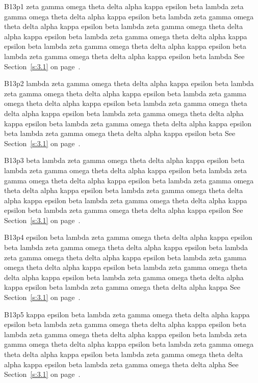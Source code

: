 B13p1 zeta gamma omega theta delta alpha kappa epsilon beta lambda zeta gamma omega theta delta alpha kappa epsilon beta lambda zeta gamma omega theta delta alpha kappa epsilon beta lambda zeta gamma omega theta delta alpha kappa epsilon beta lambda zeta gamma omega theta delta alpha kappa epsilon beta lambda zeta gamma omega theta delta alpha kappa epsilon beta lambda zeta gamma omega theta delta alpha kappa epsilon beta lambda See Section~\ref{s:3.1} on page~\pageref{s:3.1}.

B13p2 lambda zeta gamma omega theta delta alpha kappa epsilon beta lambda zeta gamma omega theta delta alpha kappa epsilon beta lambda zeta gamma omega theta delta alpha kappa epsilon beta lambda zeta gamma omega theta delta alpha kappa epsilon beta lambda zeta gamma omega theta delta alpha kappa epsilon beta lambda zeta gamma omega theta delta alpha kappa epsilon beta lambda zeta gamma omega theta delta alpha kappa epsilon beta See Section~\ref{s:3.1} on page~\pageref{s:3.1}.

B13p3 beta lambda zeta gamma omega theta delta alpha kappa epsilon beta lambda zeta gamma omega theta delta alpha kappa epsilon beta lambda zeta gamma omega theta delta alpha kappa epsilon beta lambda zeta gamma omega theta delta alpha kappa epsilon beta lambda zeta gamma omega theta delta alpha kappa epsilon beta lambda zeta gamma omega theta delta alpha kappa epsilon beta lambda zeta gamma omega theta delta alpha kappa epsilon See Section~\ref{s:3.1} on page~\pageref{s:3.1}.

B13p4 epsilon beta lambda zeta gamma omega theta delta alpha kappa epsilon beta lambda zeta gamma omega theta delta alpha kappa epsilon beta lambda zeta gamma omega theta delta alpha kappa epsilon beta lambda zeta gamma omega theta delta alpha kappa epsilon beta lambda zeta gamma omega theta delta alpha kappa epsilon beta lambda zeta gamma omega theta delta alpha kappa epsilon beta lambda zeta gamma omega theta delta alpha kappa See Section~\ref{s:3.1} on page~\pageref{s:3.1}.

B13p5 kappa epsilon beta lambda zeta gamma omega theta delta alpha kappa epsilon beta lambda zeta gamma omega theta delta alpha kappa epsilon beta lambda zeta gamma omega theta delta alpha kappa epsilon beta lambda zeta gamma omega theta delta alpha kappa epsilon beta lambda zeta gamma omega theta delta alpha kappa epsilon beta lambda zeta gamma omega theta delta alpha kappa epsilon beta lambda zeta gamma omega theta delta alpha See Section~\ref{s:3.1} on page~\pageref{s:3.1}.


